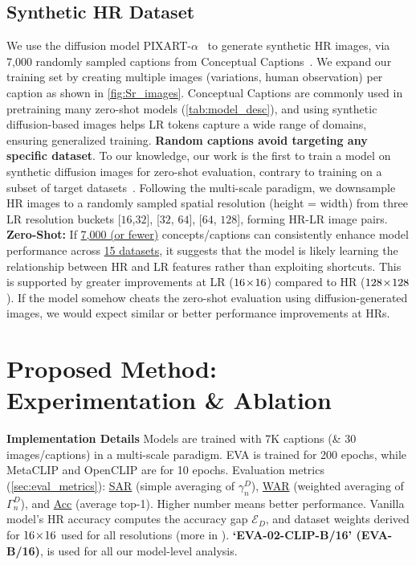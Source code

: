 \subsection{Synthetic HR Dataset}
\label{sec:training_data}
We use the diffusion model PIXART-$\alpha$~\citep{chen2023pixartalpha} to generate synthetic HR images, via 7,000 randomly sampled captions from Conceptual Captions~\citep{sharma2018conceptual}. 
We expand our training set by creating multiple images (variations, human observation) per caption as shown in \cref{fig:Sr_images}. 
Conceptual Captions are commonly used in pretraining many zero-shot models (\cref{tab:model_desc}), and using synthetic diffusion-based images helps LR tokens capture a wide range of domains, ensuring generalized training.
\textbf{Random captions avoid targeting any specific dataset}. 
To our knowledge, our work is the first to train a model on synthetic diffusion images for zero-shot evaluation, contrary to training on a subset of target datasets~\citep{chen2024robustsam}.
Following the multi-scale paradigm, we downsample HR images to a randomly sampled spatial resolution (height = width) from three LR resolution buckets {[$16$,$32$]}, {[$32$, $64$]}, {[$64$, $128$]}, forming  HR-LR image pairs. \vspace{4pt} \\ 
\noindent \textbf{Zero-Shot:}
If \underline{7,000 (or fewer)} concepts/captions can consistently enhance model performance across \underline{15 datasets}, it suggests that the model is likely learning the relationship between HR and LR features rather than exploiting shortcuts. 
This is supported by greater improvements at LR ($16\!\times\!16$) compared to HR ($128\!\times\!128$). 
If the model somehow cheats the zero-shot evaluation using diffusion-generated images, we would expect similar or better performance improvements at HRs.
\vspace{-5pt}




\section{Proposed Method: Experimentation \& Ablation}
\vspace{-4pt}
\noindent
\textbf{Implementation Details}
\label{sec:implementation}
Models are trained with 7K captions (\& 30 images/captions) in a multi-scale paradigm. 
EVA is trained for 200 epochs, while MetaCLIP and OpenCLIP are for 10 epochs. 
Evaluation metrics (\cref{sec:eval_metrics}): \underline{SAR} (simple averaging of $\gamma^{D}_{n}$), \underline{WAR} (weighted averaging of $\Gamma^{D}_{n}$), and \underline{Acc} (average top-1). Higher number means better performance. 
Vanilla model's HR accuracy computes the accuracy gap $\mathcal{E}_D$, and dataset weights derived for $16\!\times\!16$ used for all resolutions (more in \Supp). 
\textbf{`EVA-02-CLIP-B/16' (EVA-B/16)}, is used for all our model-level analysis. 
\vspace{-8pt}


